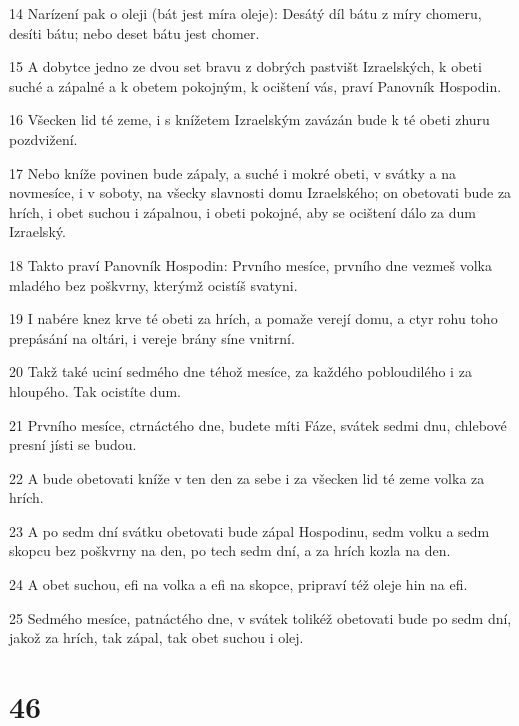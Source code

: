 \par 14 Narízení pak o oleji (bát jest míra oleje): Desátý díl bátu z míry chomeru, desíti bátu; nebo deset bátu jest chomer.
\par 15 A dobytce jedno ze dvou set bravu z dobrých pastvišt Izraelských, k obeti suché a zápalné a k obetem pokojným, k ocištení vás, praví Panovník Hospodin.
\par 16 Všecken lid té zeme, i s knížetem Izraelským zavázán bude k té obeti zhuru pozdvižení.
\par 17 Nebo kníže povinen bude zápaly, a suché i mokré obeti, v svátky a na novmesíce, i v soboty, na všecky slavnosti domu Izraelského; on obetovati bude za hrích, i obet suchou i zápalnou, i obeti pokojné, aby se ocištení dálo za dum Izraelský.
\par 18 Takto praví Panovník Hospodin: Prvního mesíce, prvního dne vezmeš volka mladého bez poškvrny, kterýmž ocistíš svatyni.
\par 19 I nabére knez krve té obeti za hrích, a pomaže verejí domu, a ctyr rohu toho prepásání na oltári, i vereje brány síne vnitrní.
\par 20 Takž také uciní sedmého dne téhož mesíce, za každého pobloudilého i za hloupého. Tak ocistíte dum.
\par 21 Prvního mesíce, ctrnáctého dne, budete míti Fáze, svátek sedmi dnu, chlebové presní jísti se budou.
\par 22 A bude obetovati kníže v ten den za sebe i za všecken lid té zeme volka za hrích.
\par 23 A po sedm dní svátku obetovati bude zápal Hospodinu, sedm volku a sedm skopcu bez poškvrny na den, po tech sedm dní, a za hrích kozla na den.
\par 24 A obet suchou, efi na volka a efi na skopce, pripraví též oleje hin na efi.
\par 25 Sedmého mesíce, patnáctého dne, v svátek tolikéž obetovati bude po sedm dní, jakož za hrích, tak zápal, tak obet suchou i olej.

\chapter{46}

